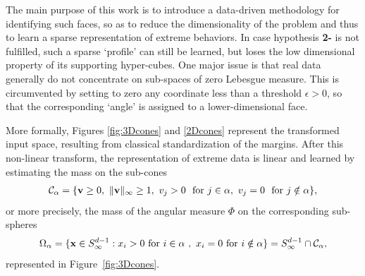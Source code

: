 The main purpose of this work is to introduce a data-driven methodology for identifying such faces, so as to reduce the
dimensionality of the problem and thus to learn a sparse representation  of extreme behaviors. 
In case hypothesis \textbf{2-} is not fulfilled, such a sparse  `profile' can still be learned, but loses the low dimensional property of its supporting hyper-cubes.
One major issue is that real data generally do not concentrate on sub-spaces of zero Lebesgue measure. This is circumvented by setting to zero any coordinate less than a threshold $\epsilon>0$, so that the corresponding `angle' is assigned to a lower-dimensional face. 

More formally, Figures \ref{fig:3Dcones} and \ref{2Dcones} represent the transformed input space, resulting from classical standardization of the margins. After this non-linear transform, the representation of extreme data is linear and learned by estimating the mass on the sub-cones
\begin{align*}
 \mathcal{C}_\alpha = \{\mathbf v \ge 0,~\|\mathbf v\|_\infty \ge 1,~ v_j > 0 ~\text{ for } j \in \alpha,~ v_j = 0 ~\text{ for } j \notin \alpha \},
\end{align*}
or more precisely, the mass of the angular measure $\Phi$ on the corresponding sub-spheres
\begin{align*}
\Omega_{\alpha}  = \{\mathbf x \in S_{\infty}^{d-1} :  x_i > 0 \text{ for } i\in\alpha~,~  x_i = 0 \text{ for } i\notin \alpha   \} 
 = S_{\infty}^{d-1}\cap {\mathcal{C}}_\alpha,
\end{align*}
represented in Figure~\ref{fig:3Dcones}.

